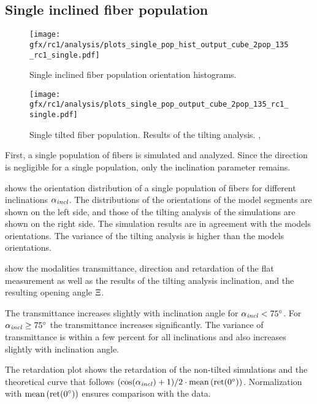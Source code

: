 \subsection{Single inclined fiber population}
\label{sec:resSingleIncl}
%
\begin{figure}[!t]
\centering
\texttt{[image: gfx/rc1/analysis/plots\_single\_pop\_hist\_output\_cube\_2pop\_135\_rc1\_single.pdf]}
\caption{Single inclined fiber population orientation histograms. }
\label{fig:single_fiber_pop_hist}
\end{figure}
%
\begin{figure}[!p]
\centering
\texttt{[image: gfx/rc1/analysis/plots\_single\_pop\_output\_cube\_2pop\_135\_rc1\_single.pdf]}
\caption{Single tilted fiber population. Results of the tilting analysis. , }
\label{fig:single_fiber_pop_rofl}
\end{figure}
%
First, a single population of fibers is simulated and analyzed.
Since the direction is negligible for a single population, only the inclination parameter \modelInc{} remains.
\par
%
 shows the orientation distribution of a single population of fibers for different inclinations $\textnormal{$\alpha_{\mathit{incl}}$}{}$.
The distributions of the orientations of the model segments are shown on the left side, and those of the tilting analysis of the simulations are shown on the right side.
The simulation results are in agreement with the models orientations.
The variance of the tilting analysis is higher than the models orientations.
\par
%
 show the modalities transmittance, direction and retardation of the flat measurement as well as the results of the tilting analysis inclination, \trel{} and the resulting opening angle $\textnormal{$\Xi$}$.
\par
% 
The transmittance increases slightly with inclination angle for $\textnormal{$\alpha_{\mathit{incl}}$}<\SI{75}{\degree}$.
For $\textnormal{$\alpha_{\mathit{incl}}$} \ge \SI{75}{\degree}$ the transmittance increases significantly.
The variance of transmittance is within a few percent for all inclinations and also increases slightly with inclination angle.
\par
%
The retardation plot shows the retardation of the non-tilted simulations and the theoretical curve that follows $(\cos(\textnormal{$\alpha_{\mathit{incl}}$}) + 1) / 2 \cdot \operatorname{mean}\left(\mathrm{ret}(\SI{0}{\degree})\right)$.
Normalization with $\operatorname{mean}\left(\mathrm{ret}(\SI{0}{\degree})\right)$ ensures comparison with the data.
